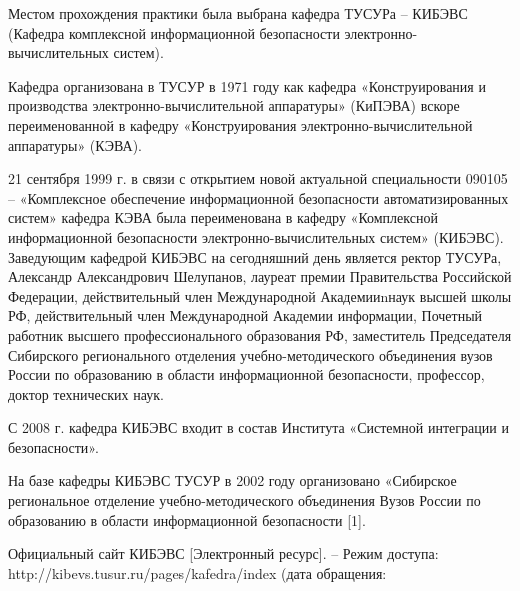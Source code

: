 Местом прохождения практики была выбрана кафедра ТУСУРа – КИБЭВС (Кафедра комплексной информационной безопасности электронно-
вычислительных систем).

Кафедра организована в ТУСУР в 1971 году как кафедра «Конструирования и производства электронно-вычислительной аппаратуры»
(КиПЭВА) вскоре переименованной в кафедру «Конструирования электронно-вычислительной аппаратуры» (КЭВА). 

21 сентября 1999 г. в связи с открытием новой актуальной специальности 090105 – «Комплексное обеспечение информационной
безопасности автоматизированных систем» кафедра КЭВА была переименована в кафедру «Комплексной информационной безопасности
электронно-вычислительных систем» (КИБЭВС). Заведующим кафедрой КИБЭВС на сегодняшний день является ректор
ТУСУРа, Александр Александрович Шелупанов, лауреат премии Правительства Российской Федерации, действительный член 
Международной Академииnнаук высшей школы РФ, действительный член Международной Академии информации, 
Почетный работник высшего профессионального образования РФ, заместитель Председателя Сибирского регионального 
отделения учебно-методического объединения вузов России по образованию в области информационной безопасности, профессор, доктор технических наук.

С 2008 г. кафедра КИБЭВС входит в состав Института «Системной
интеграции и безопасности».

На базе кафедры КИБЭВС ТУСУР в 2002 году организовано «Сибирское региональное отделение учебно-методического объединения
Вузов России по образованию в области информационной безопасности [1].

Официальный сайт КИБЭВС [Электронный ресурс]. – Режим
доступа: http://kibevs.tusur.ru/pages/kafedra/index (дата обращения: